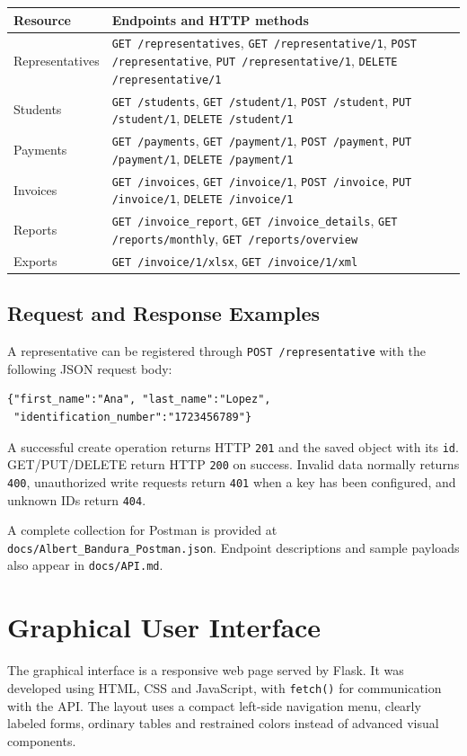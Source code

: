 \documentclass[11pt,letterpaper]{article}
\begin{document}
\begin{center}\small
\begin{tabular}{p{2.7cm}p{8.9cm}}\toprule Resource & Endpoints and HTTP methods \\ \midrule
Representatives & \texttt{GET /representatives}, \texttt{GET /representative/1}, \texttt{POST /representative}, \texttt{PUT /representative/1}, \texttt{DELETE /representative/1} \\
Students & \texttt{GET /students}, \texttt{GET /student/1}, \texttt{POST /student}, \texttt{PUT /student/1}, \texttt{DELETE /student/1} \\
Payments & \texttt{GET /payments}, \texttt{GET /payment/1}, \texttt{POST /payment}, \texttt{PUT /payment/1}, \texttt{DELETE /payment/1} \\
Invoices & \texttt{GET /invoices}, \texttt{GET /invoice/1}, \texttt{POST /invoice}, \texttt{PUT /invoice/1}, \texttt{DELETE /invoice/1} \\
Reports & \texttt{GET /invoice\_report}, \texttt{GET /invoice\_details}, \texttt{GET /reports/monthly}, \texttt{GET /reports/overview} \\
Exports & \texttt{GET /invoice/1/xlsx}, \texttt{GET /invoice/1/xml} \\
\bottomrule\end{tabular}\end{center}

\subsection{Request and Response Examples}
A representative can be registered through \texttt{POST /representative} with the following JSON request body:
\begin{lstlisting}
{"first_name":"Ana", "last_name":"Lopez",
 "identification_number":"1723456789"}
\end{lstlisting}
A successful create operation returns HTTP \texttt{201} and the saved object with its \texttt{id}. GET/PUT/DELETE return HTTP \texttt{200} on success. Invalid data normally returns \texttt{400}, unauthorized write requests return \texttt{401} when a key has been configured, and unknown IDs return \texttt{404}.

A complete collection for Postman is provided at \texttt{docs/Albert\_Bandura\_Postman.json}. Endpoint descriptions and sample payloads also appear in \texttt{docs/API.md}.

\section{Graphical User Interface}
The graphical interface is a responsive web page served by Flask. It was developed using HTML, CSS and JavaScript, with \texttt{fetch()} for communication with the API. The layout uses a compact left-side navigation menu, clearly labeled forms, ordinary tables and restrained colors instead of advanced visual components.
\end{document}
